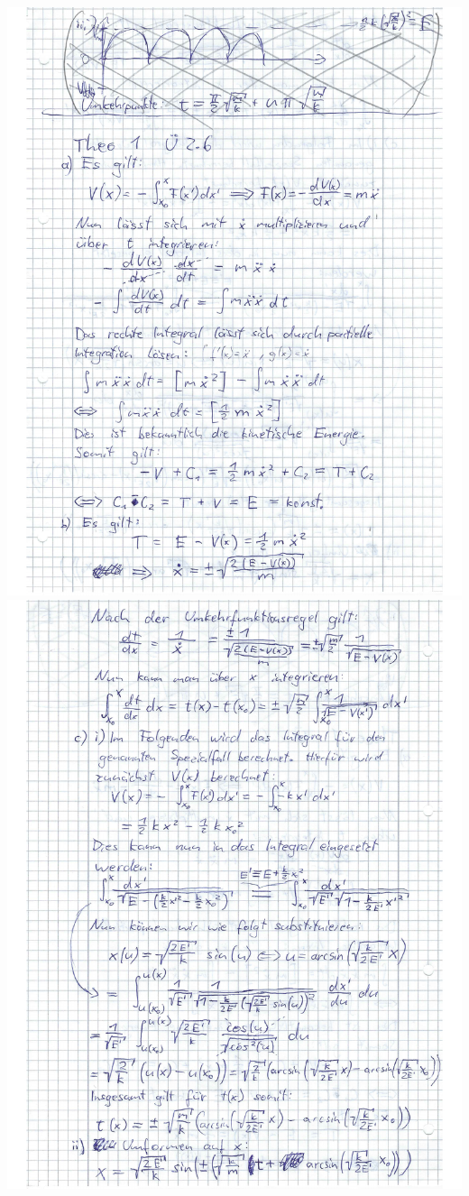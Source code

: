 \documentclass{theozettel}
\begin{document}
\begin{center}
\includegraphics[width=15cm]{A2-Teil1.pdf}\\
\includegraphics[width=15cm]{A2-Teil2.pdf}\\

\end{center}
\end{document}
